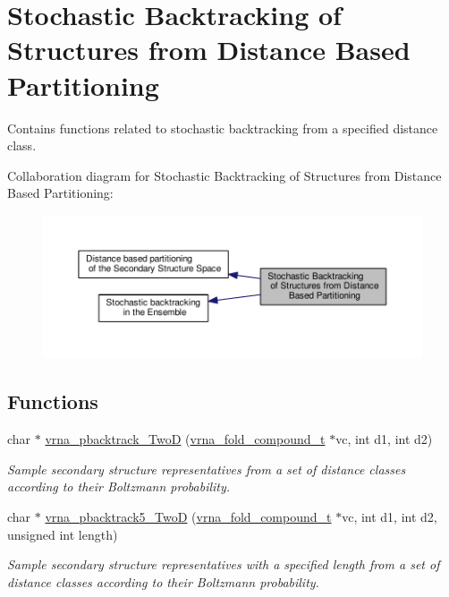 \hypertarget{group__kl__neighborhood__stochbt}{\section{Stochastic Backtracking of Structures from Distance Based Partitioning}
\label{group__kl__neighborhood__stochbt}
}


Contains functions related to stochastic backtracking from a specified distance class.  


Collaboration diagram for Stochastic Backtracking of Structures from Distance Based Partitioning\+:
\nopagebreak
\begin{figure}[H]
\begin{center}
\leavevmode
\includegraphics[width=350pt]{group__kl__neighborhood__stochbt}
\end{center}
\end{figure}
\subsection*{Functions}
\begin{DoxyCompactItemize}
\item 
char $\ast$ \hyperlink{group__kl__neighborhood__stochbt_ga14aceef73f83bbde77bb3a0ca06c9d13}{vrna\+\_\+pbacktrack\+\_\+\+Two\+D} (\hyperlink{group__fold__compound_ga1b0cef17fd40466cef5968eaeeff6166}{vrna\+\_\+fold\+\_\+compound\+\_\+t} $\ast$vc, int d1, int d2)
\begin{DoxyCompactList}\small\item\em Sample secondary structure representatives from a set of distance classes according to their Boltzmann probability. \end{DoxyCompactList}\item 
char $\ast$ \hyperlink{group__kl__neighborhood__stochbt_ga6504913303bc325659c365d5f59b41e0}{vrna\+\_\+pbacktrack5\+\_\+\+Two\+D} (\hyperlink{group__fold__compound_ga1b0cef17fd40466cef5968eaeeff6166}{vrna\+\_\+fold\+\_\+compound\+\_\+t} $\ast$vc, int d1, int d2, unsigned int length)
\begin{DoxyCompactList}\small\item\em Sample secondary structure representatives with a specified length from a set of distance classes according to their Boltzmann probability. \end{DoxyCompactList}\end{DoxyCompactItemize}


